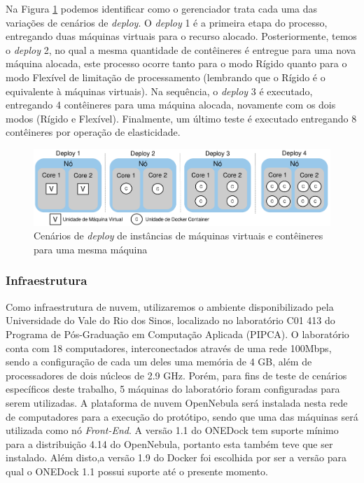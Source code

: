 \documentclass[twoside,english,brazilian]{UNISINOSartigo}
\begin{document}
Na Figura \ref{fig:deploy} podemos identificar como o gerenciador trata cada uma das variações de cenários de \textit{deploy}. O \textit{deploy} 1 é a primeira etapa do processo, entregando duas máquinas virtuais para o recurso alocado. Posteriormente, temos o \textit{deploy} 2, no qual a mesma quantidade de contêineres é entregue para uma nova máquina alocada, este processo ocorre tanto para o modo Rígido quanto para o modo Flexível de limitação de processamento (lembrando que o Rígido é o equivalente à máquinas virtuais). Na sequência, o \textit{deploy} 3 é executado, entregando 4 contêineres para uma máquina alocada, novamente com os dois modos (Rígido e Flexível). Finalmente, um último teste é executado entregando 8 contêineres por operação de elasticidade.

\begin{figure}[h!]
	\caption{Cenários de \textit{deploy} de instâncias de máquinas virtuais e contêineres para uma mesma máquina}
	\label{fig:deploy}
	\centering%
	\begin{minipage}{0.8\textwidth}
		\includegraphics[width=\textwidth]{images/deploy}
	\end{minipage}
\end{figure}

\subsubsection{Infraestrutura}

Como infraestrutura de nuvem, utilizaremos o ambiente disponibilizado pela Universidade do Vale do Rio dos Sinos, localizado no laboratório C01 413 do Programa de Pós-Graduação em Computação Aplicada (PIPCA). O laboratório conta com 18 computadores, interconectados através de uma rede 100Mbps, sendo a configuração de cada um deles uma memória de 4 GB, além de processadores de dois núcleos de 2.9 GHz. Porém, para fins de teste de cenários específicos deste trabalho, 5 máquinas do laboratório foram configuradas para serem utilizadas. A plataforma de nuvem OpenNebula será instalada nesta rede de computadores para a execução do protótipo, sendo que uma das máquinas será utilizada como nó \textit{Front-End}. 
A versão 1.1 do ONEDock tem suporte mínimo para a distribuição 4.14 do OpenNebula, portanto esta também teve que ser instalado. Além disto,a versão 1.9 do Docker foi escolhida por ser a versão para qual o ONEDock 1.1 possui suporte até o presente momento. 
\end{document}
